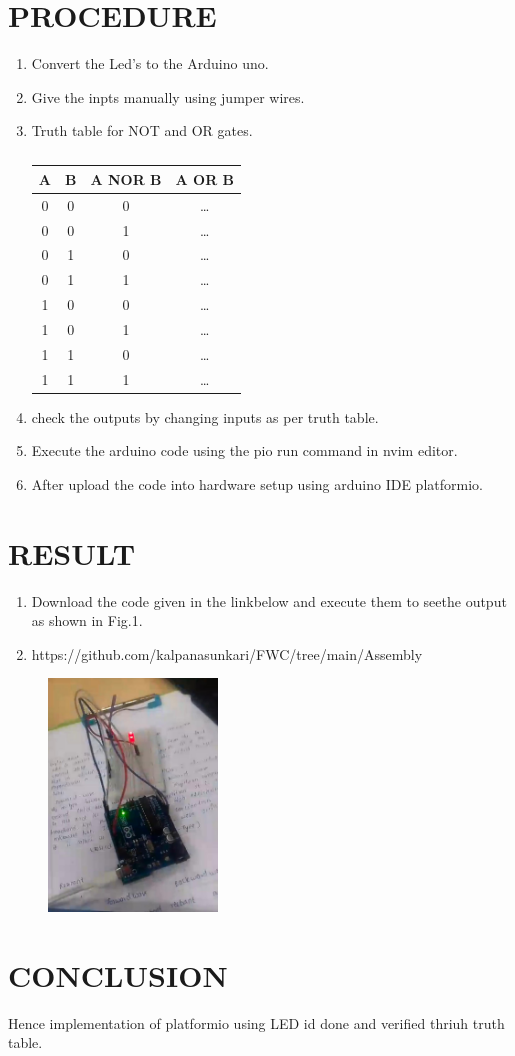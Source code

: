 \documentclass[conference]{IEEEtran}                   \IEEEoverridecommandlockouts
\begin{document}
\section{PROCEDURE}
\begin{enumerate}
	\item Convert the Led's to the Arduino uno.
	\item Give the inpts manually using jumper wires.
	\item Truth table for NOT and OR gates.
		\begin{table}[htbp]
			\centering
		


\begin{tabular}{|c|c|c|c|}
\hline
	A & B & A NOR B & A OR B \\
\hline
0 & 0 & 0 & \ldots \\
0 & 0 & 1 & \ldots \\
0 & 1 & 0 & \ldots \\
0 & 1 & 1 & \ldots \\
1 & 0 & 0 & \ldots \\
1 & 0 & 1 & \ldots \\
1 & 1 & 0 & \ldots \\
1 & 1 & 1 & \ldots \\
\hline
\end{tabular}
		
	\vspace{0.1cm}
	\caption{\label{tab:widgets}}
		\end{table}
	\item check the outputs by changing inputs as per truth table.
	\item Execute the arduino code using the pio run command in nvim editor.
	\item After upload the code into hardware setup using arduino IDE platformio.
\end{enumerate}
\section{RESULT}
\begin{enumerate}
	\item Download the code given in the linkbelow and execute them to seethe output as shown in Fig.1.
	\item https://github.com/kalpanasunkari/FWC/tree/main/Assembly
\end{enumerate}

\begin{figure}[h]
	\centering
	\includegraphics[width=0.4\textwidth]{2.jpg}
	\caption{\label{fig-5:Gates}}
\end{figure}
\section{CONCLUSION}
Hence implementation of platformio using LED id done and verified thriuh truth table.
\end{document}
